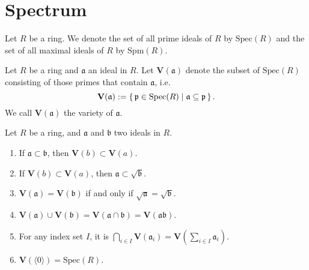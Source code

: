 \chapter{Spectrum}

\begin{defn}[Spectrum]
    Let \(R\) be a ring. We denote the set of all prime ideals of \(R\) by \(\mathrm{Spec}(R)\) and the set of all maximal ideals of \(R\) by \(\mathrm{Spm}(R)\).
\end{defn}

\begin{defn}[Variety]
    Let \(R\) be a ring and \(\mathfrak{a}\) an ideal in \(R\). Let \(\mathbf{V}(\mathfrak{a})\) denote the subset of \(\mathrm{Spec}(R)\) consisting of those primes that contain \(\mathfrak{a}\), i.e.
    \begin{equation}
        \mathbf{V}(\mathfrak{a}) := \left\{\, \mathfrak{p} \in \mathrm{Spec}(R) \mathrel{\mid} \mathfrak{a} \subseteq \mathfrak{p} \,\right\}\text{.}
    \end{equation}
    We call \(\mathbf{V}(\mathfrak{a})\) the variety of \(\mathfrak{a}\).
\end{defn}

\begin{prps}
    Let \(R\) be a ring, and \(\mathfrak{a}\) and \(\mathfrak{b}\) two ideals in \(R\).
    \begin{enumerate}
        \item If \(\mathfrak{a} \subset \mathfrak{b}\), then \(\mathbf{V}(b) \subset \mathbf{V}(a)\).
        \item If \(\mathbf{V}(b) \subset \mathbf{V}(a)\), then \(\mathfrak{a} \subset \sqrt{\mathfrak{b}}\).
        \item \(\mathbf{V}(\mathfrak{a}) = \mathbf{V}(\mathfrak{b})\) if and only if \(\sqrt{\mathfrak{a}} = \sqrt{\mathfrak{b}}\).
        \item \(\mathbf{V}(\mathfrak{a}) \cup \mathbf{V}(\mathfrak{b}) = \mathbf{V}(\mathfrak{a} \cap \mathfrak{b}) = \mathbf{V}(\mathfrak{a}\mathfrak{b})\).
        \item For any index set \(I\), it is \(\bigcap_{i \in I}\mathbf{V}(\mathfrak{a}_i) = \mathbf{V}(\sum_{i \in I}\mathfrak{a}_i)\).
        \item \(\mathbf{V}(\langle 0 \rangle) = \mathrm{Spec}(R)\).
    \end{enumerate}
\end{prps}


